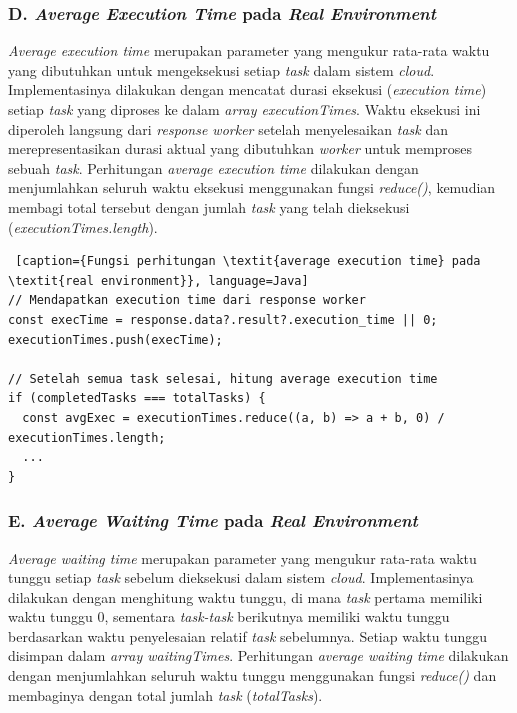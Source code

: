 \subsubsection{D. \textit{Average Execution Time} pada \textit{Real Environment}}
\textit{Average execution time} merupakan parameter yang mengukur rata-rata waktu yang dibutuhkan untuk mengeksekusi setiap \textit{task} dalam sistem \textit{cloud}. Implementasinya dilakukan dengan mencatat durasi eksekusi (\textit{execution time}) setiap \textit{task} yang diproses ke dalam \textit{array executionTimes}. Waktu eksekusi ini diperoleh langsung dari \textit{response worker} setelah menyelesaikan \textit{task} dan merepresentasikan durasi aktual yang dibutuhkan \textit{worker} untuk memproses sebuah \textit{task}. Perhitungan \textit{average execution time} dilakukan dengan menjumlahkan seluruh waktu eksekusi menggunakan fungsi \textit{reduce()}, kemudian membagi total tersebut dengan jumlah \textit{task} yang telah dieksekusi (\textit{executionTimes.length}).

\begin{lstlisting} [caption={Fungsi perhitungan \textit{average execution time} pada \textit{real environment}}, language=Java]
// Mendapatkan execution time dari response worker
const execTime = response.data?.result?.execution_time || 0;
executionTimes.push(execTime);

// Setelah semua task selesai, hitung average execution time
if (completedTasks === totalTasks) {
  const avgExec = executionTimes.reduce((a, b) => a + b, 0) / executionTimes.length;
  ...
}
\end{lstlisting}

\subsubsection{E. \textit{Average Waiting Time} pada \textit{Real Environment}}
\textit{Average waiting time} merupakan parameter yang mengukur rata-rata waktu tunggu setiap \textit{task} sebelum dieksekusi dalam sistem \textit{cloud}. Implementasinya dilakukan dengan menghitung waktu tunggu, di mana \textit{task} pertama memiliki waktu tunggu 0, sementara \textit{task-task} berikutnya memiliki waktu tunggu berdasarkan waktu penyelesaian relatif \textit{task} sebelumnya. Setiap waktu tunggu disimpan dalam \textit{array waitingTimes}. Perhitungan \textit{average waiting time} dilakukan dengan menjumlahkan seluruh waktu tunggu menggunakan fungsi \textit{reduce()} dan membaginya dengan total jumlah \textit{task} (\textit{totalTasks}).

